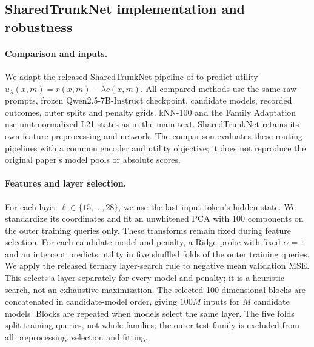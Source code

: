 \subsection{SharedTrunkNet implementation and robustness}
\label{app:sharedtrunknet}

\paragraph{Comparison and inputs.}
We adapt the released SharedTrunkNet pipeline of \citet{varshney2026prefill} to predict utility $u_\lambda(x,m)=r(x,m)-\lambda c(x,m)$.
All compared methods use the same raw prompts, frozen Qwen2.5-7B-Instruct checkpoint, candidate models, recorded outcomes, outer splits and penalty grids.
kNN-100 and the Family Adaptation use unit-normalized L21 states as in the main text.
SharedTrunkNet retains its own feature preprocessing and network.
The comparison evaluates these routing pipelines with a common encoder and utility objective; it does not reproduce the original paper's model pools or absolute scores.

\paragraph{Features and layer selection.}
For each layer $\ell\in\{15,\ldots,28\}$, we use the last input token's hidden state.
We standardize its coordinates and fit an unwhitened PCA with 100 components on the outer training queries only.
These transforms remain fixed during feature selection.
For each candidate model and penalty, a Ridge probe with fixed $\alpha=1$ and an intercept predicts utility in five shuffled folds of the outer training queries.
We apply the released ternary layer-search rule to negative mean validation MSE.
This selects a layer separately for every model and penalty; it is a heuristic search, not an exhaustive maximization.
The selected 100-dimensional blocks are concatenated in candidate-model order, giving $100M$ inputs for $M$ candidate models.
Blocks are repeated when models select the same layer.
The five folds split training queries, not whole families; the outer test family is excluded from all preprocessing, selection and fitting.

